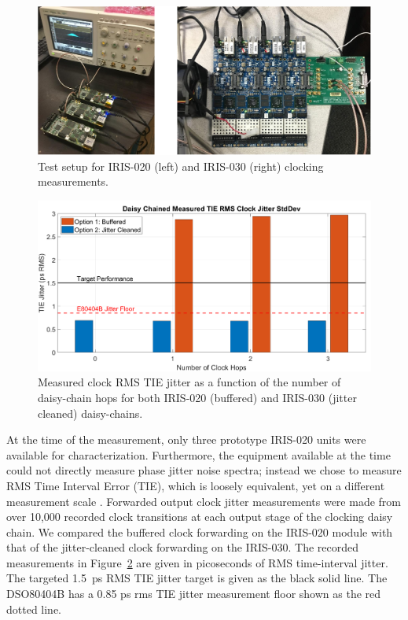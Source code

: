 \begin{figure}[p]
\centering
\includegraphics[width=1\textwidth]{figs/clk/iris020_iris030_pics}
\caption{Test setup for IRIS-020 (left) and IRIS-030 (right) clocking measurements.}
\label{fig_iris_pictures}
\end{figure}

\begin{figure}[p]
\centering
\includegraphics[width=1\textwidth]{figs/clk/iris_jitter_barplot}
\caption{Measured clock RMS TIE jitter as a function of the number of daisy-chain hops for both IRIS-020 (buffered) and IRIS-030 (jitter cleaned) daisy-chains.}
\label{fig_multihop_jitter}
\end{figure}

	At the time of the measurement, only three prototype IRIS-020 units were available for characterization.
	Furthermore, the equipment available at the time could not directly measure phase jitter noise spectra; instead we chose to measure RMS Time Interval Error (TIE), which is loosely equivalent, yet on a different measurement scale \cite{an687}.
	Forwarded output clock jitter measurements were made from over 10,000 recorded clock transitions at each output stage of the clocking daisy chain.
	We compared the buffered clock forwarding on the IRIS-020 module with that of the jitter-cleaned clock forwarding on the IRIS-030.
	The recorded measurements in Figure~\ref{fig_multihop_jitter} are given in picoseconds of RMS time-interval jitter. The targeted 1.5~ps RMS TIE jitter target is given as the black solid line.
	The DSO80404B has a 0.85 ps rms TIE jitter measurement floor shown as the red dotted line.
	
